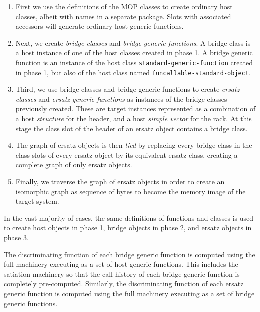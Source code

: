 \begin{enumerate}
\item First we use the definitions of the MOP classes to create
  ordinary host classes, albeit with names in a separate package.
  Slots with associated accessors will generate ordinary host generic
  functions. 
\item Next, we create \emph{bridge classes} and \emph{bridge generic
  functions}.  A bridge class is a host instance of one of the host
  classes created in phase 1.  A bridge generic function is an
  instance of the host class \texttt{standard-generic-function}
  created in phase 1, but also of the host class named
  \texttt{funcallable-standard-object}.
\item Third, we use bridge classes and bridge generic functions to
  create \emph{ersatz classes} and \emph{ersatz generic functions} as
  instances of the bridge classes previously created.  These are
  target instances represented as a combination of a host
  \emph{structure} for the header, and a host \emph{simple vector} for
  the rack.  At this stage the class slot of the header of an ersatz
  object contains a bridge class.
\item The graph of ersatz objects is then \emph{tied} by
  replacing every bridge class in the class slots of every ersatz
  object by its equivalent ersatz class, creating a complete graph of
  only ersatz objects. 
\item Finally, we traverse the graph of ersatz objects in order to
  create an isomorphic graph as sequence of bytes to become the memory
  image of the target system.
\end{enumerate}

In the vast majority of cases, the same definitions of functions and
classes is used to create host objects in phase 1, bridge objects in
phase 2, and ersatz objects in phase 3. 

The discriminating function of each bridge generic function is
computed using the full machinery executing as a set of host generic
functions.  This includes the satiation machinery so that the call
history of each bridge generic function is completely pre-computed.
Similarly, the discriminating function of each ersatz generic function
is computed using the full machinery executing as a set of bridge
generic functions.  

